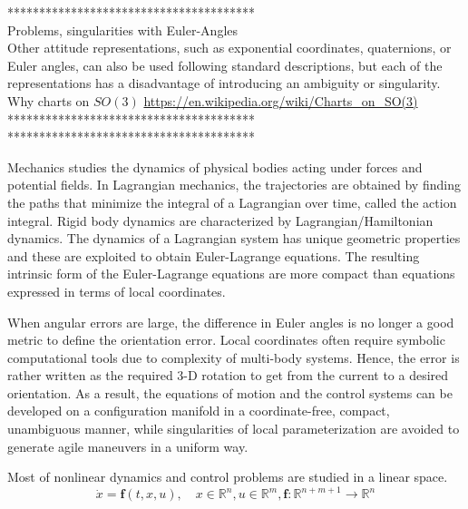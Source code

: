 ***************************************\\
Problems, singularities with Euler-Angles\\
Other attitude representations, such as exponential coordinates, quaternions, or Euler
angles, can also be used following standard descriptions, but each of the representations has a disadvantage
of introducing an ambiguity or singularity.
Why charts on $ SO(3) $ \url{https://en.wikipedia.org/wiki/Charts_on_SO(3)}\\

***************************************\\


***************************************\\
\cite{Lee}

Mechanics studies the dynamics of physical bodies acting under forces and potential fields. 
In Lagrangian mechanics, the trajectories are obtained by finding the paths that minimize the integral of a Lagrangian over time, called the action integral. 
Rigid body dynamics are characterized by Lagrangian/Hamiltonian dynamics. The dynamics of a Lagrangian system has unique geometric properties and these are exploited to obtain Euler-Lagrange equations. The resulting intrinsic form of the Euler-Lagrange equations are more compact than equations expressed in terms of local coordinates.

When angular errors are large, the difference in Euler angles is no longer a good metric to define the orientation error. Local coordinates often require symbolic computational tools due to complexity of multi-body systems. Hence, the error is rather written as the required 3-D rotation to get from the current to a desired orientation. As a result, the equations of motion and the control systems can be developed on a configuration manifold in a coordinate-free, compact, unambiguous manner, while singularities of local parameterization are avoided to generate agile maneuvers in a uniform way. 				

Most of nonlinear dynamics and control problems are studied in a linear space.\\
\begin{equation}\label{key}
\dot{x}=\textbf{f}(t,x,u), \quad x\in\mathbb{R}^n, u\in\mathbb{R}^m, \textbf{f}:\mathbb{R}^{n+m+1}\rightarrow\mathbb{R}^n
\end{equation}


